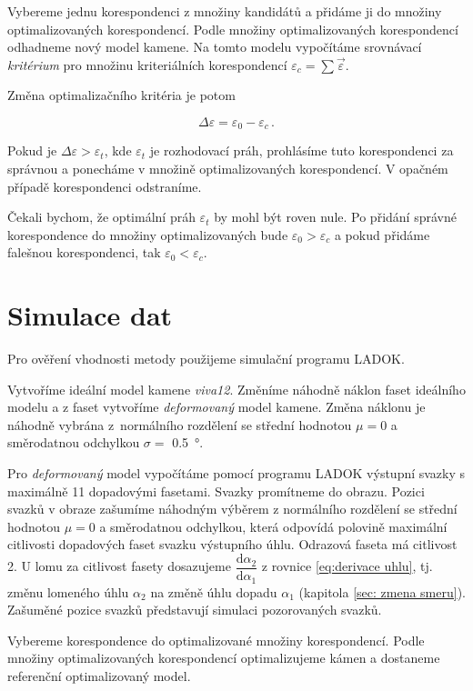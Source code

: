 	Vybereme jednu korespondenci z množiny kandidátů a přidáme ji do množiny optimalizovaných korespondencí. Podle množiny optimalizovaných korespondencí odhadneme nový model kamene. Na tomto modelu  vypočítáme srovnávací \textit{kritérium} pro množinu kriteriálních korespondencí $\varepsilon_c = \sum\vec{\varepsilon}$. 
	
	Změna optimalizačního kritéria je potom 
	
	\begin{equation}
	\Delta\varepsilon  = \varepsilon_0 - \varepsilon_c\,.
	\end{equation}
	
	Pokud je $\Delta\varepsilon  > \varepsilon_t$, kde $\varepsilon_t$ je rozhodovací práh, prohlásíme tuto korespondenci za správnou a ponecháme v množině optimalizovaných korespondencí. V opačném případě korespondenci odstraníme.
	
	Čekali bychom, že optimální práh $\varepsilon_t$ by mohl být roven nule. Po přidání správné korespondence do množiny optimalizovaných bude  $\varepsilon_0 > \varepsilon_c$ a pokud přidáme falešnou korespondenci, tak $\varepsilon_0 < \varepsilon_c$. 

\section{Simulace dat}
\label{sec: sber dat}
	Pro ověření vhodnosti metody použijeme simulační programu LADOK. 	
	
	Vytvoříme ideální model kamene \textit{viva12}. Změníme náhodně náklon faset ideálního modelu a z faset vytvoříme \textit{deformovaný} model kamene. Změna náklonu je náhodně vybrána z~normálního rozdělení se střední hodnotou $\mu = 0$ a směrodatnou odchylkou $\sigma = $ \SI{0.5}{\degree}. 
	
	 Pro \textit{deformovaný} model vypočítáme pomocí programu LADOK výstupní svazky s maximálně 11 dopadovými fasetami. Svazky promítneme do obrazu. Pozici svazků v obraze zašumíme náhodným výběrem z normálního rozdělení se střední hodnotou $\mu = 0$ a směrodatnou odchylkou, která odpovídá polovině maximální citlivosti dopadových faset svazku výstupního úhlu. Odrazová faseta má citlivost 2. U lomu za citlivost fasety dosazujeme $\dfrac{\mathrm{d}\alpha_2}{\mathrm{d}\alpha_1}$ z rovnice \ref{eq:derivace uhlu}, tj. změnu lomeného úhlu $\alpha_2$ na změně úhlu dopadu $\alpha_1$ (kapitola \ref{sec: zmena smeru}). Zašuměné pozice svazků představují simulaci pozorovaných svazků.  
	 
	Vybereme korespondence do optimalizované množiny korespondencí. Podle množiny optimalizovaných korespondencí optimalizujeme kámen a dostaneme referenční optimalizovaný model. 
	
